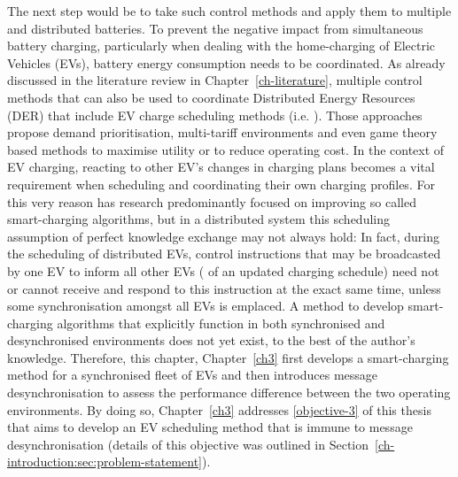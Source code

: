 The next step would be to take such control methods and apply them to multiple and distributed batteries.
To prevent the negative impact from simultaneous battery charging, particularly when dealing with the home-charging of Electric Vehicles (EVs), battery energy consumption needs to be coordinated.
As already discussed in the literature review in Chapter~\ref{ch-literature}, multiple control methods that can also be used to coordinate Distributed Energy Resources (DER) that include EV charge scheduling methods (i.e. \cite{Atia2016, Bidram2012, Bidram2014, Dolan2012, Gill2014, Guerrero2008, Guerrero2013, Sugihara2013, Toledo2013, Wang2016, Vovos2007, Guerrero2013a, Mansouri-Samani1993, Marra2013, Mokhtari2013}). 
Those approaches propose demand prioritisation, multi-tariff environments and even game theory based methods to maximise utility or to reduce operating cost.
In the context of EV charging, reacting to other EV's changes in charging plans becomes a vital requirement when scheduling and coordinating their own charging profiles.
For this very reason has research predominantly focused on improving so called smart-charging algorithms, but in a distributed system this scheduling assumption of perfect knowledge exchange may not always hold:
In fact, during the scheduling of distributed EVs, control instructions that may be broadcasted by one EV to inform all other EVs ( of an updated charging schedule) need not or cannot receive and respond to this instruction at the exact same time, unless some synchronisation amongst all EVs is emplaced.
A method to develop smart-charging algorithms that explicitly function in both synchronised and desynchronised environments does not yet exist, to the best of the author's knowledge.
Therefore, this chapter, Chapter~\ref{ch3} first develops a smart-charging method for a synchronised fleet of EVs and then introduces message desynchronisation to assess the performance difference between the two operating environments.
By doing so, Chapter~\ref{ch3} addresses \ref{objective-3} of this thesis that aims to develop an EV scheduling method that is immune to message desynchronisation (details of this objective was outlined in Section~\ref{ch-introduction:sec:problem-statement}).

